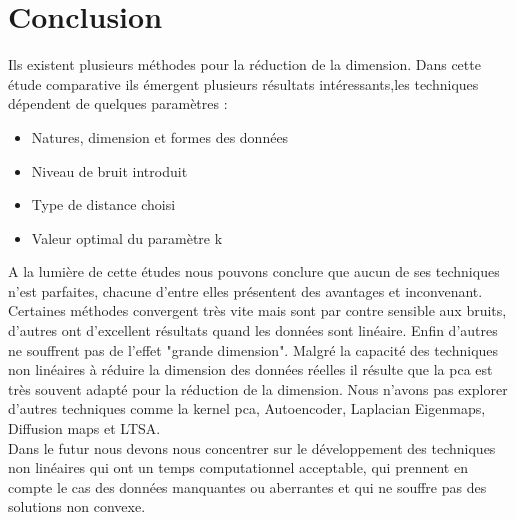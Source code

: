 \documentclass[twoside,twocolumn]{article}
\begin{document}
\section{Conclusion }
Ils existent plusieurs méthodes pour la réduction de la dimension. Dans cette étude comparative ils émergent plusieurs résultats intéressants,les techniques dépendent de quelques paramètres :
\begin{itemize}
\item Natures, dimension et formes des données
\item Niveau de bruit introduit
\item Type de distance choisi  
\item Valeur optimal du paramètre k
\end{itemize}A la lumière de cette études nous pouvons conclure que aucun de ses techniques n’est parfaites, chacune d’entre elles présentent des avantages et inconvenant.
Certaines méthodes convergent très vite mais sont par contre sensible aux bruits, d’autres ont d’excellent résultats quand les données sont linéaire. Enfin d'autres ne souffrent pas de l'effet "grande dimension". Malgré la capacité des techniques non linéaires à réduire la dimension des données réelles il résulte que la pca est très souvent adapté pour la réduction de la dimension. Nous n'avons pas explorer d'autres techniques comme la kernel pca, Autoencoder, Laplacian
Eigenmaps, Diffusion maps et LTSA.\\

Dans le futur nous devons nous concentrer sur le développement des techniques non linéaires qui ont un temps computationnel acceptable, qui prennent en compte le cas des données manquantes ou aberrantes et qui ne souffre pas des solutions non convexe.

  


\end{document}
